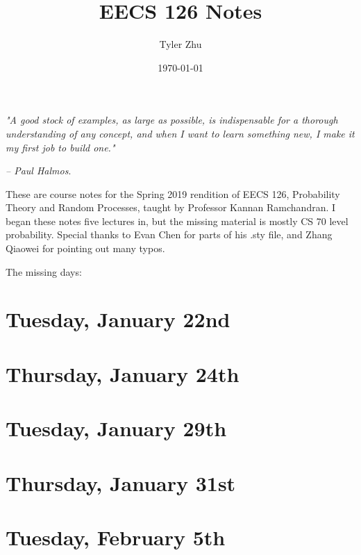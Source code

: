 \documentclass[11 pt]{scrartcl}
\begin{document}
 
\title{\Large EECS 126 Notes}
\author{\large Tyler Zhu}
\date{\large\today}

\maketitle 

\begin{center}
\begin{displayquote}
    \emph{"A good stock of examples, as large as possible, is indispensable for a thorough understanding of any concept, and when I want to learn something new, I make it my first job to build one."} \\ \begin{flushright} \emph{– Paul Halmos}.  \end{flushright}
\end{displayquote}
\end{center}


These are course notes for the Spring 2019 rendition of EECS 126, Probability Theory and Random Processes, taught by Professor Kannan Ramchandran. I began these notes five lectures in, but the missing material is mostly CS 70 level probability. Special thanks to Evan Chen for parts of his .sty file, and Zhang Qiaowei for pointing out many typos.  

\tableofcontents 

\newpage


The missing days: 

\section{Tuesday, January 22nd}
\section{Thursday, January 24th}
\section{Tuesday, January 29th}
\section{Thursday, January 31st}
\section{Tuesday, February 5th}
\end{document}

